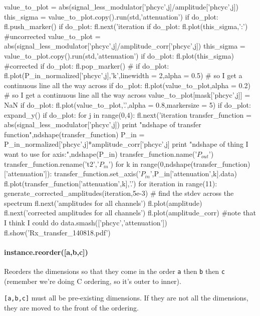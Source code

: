 \begin{python}
{{{        value_to_plot = abs(signal_less_modulator['phcyc',j]/amplitude['phcyc',j])
        this_sigma = value_to_plot.copy().run(std,'attenuation')
        if do_plot: fl.push_marker()
        if do_plot: fl.next('iteration %
        if do_plot: fl.plot(this_sigma,':') #uncorrected
        value_to_plot = abs(signal_less_modulator['phcyc',j]/amplitude_corr['phcyc',j])
        this_sigma = value_to_plot.copy().run(std,'attenuation')
        if do_plot: fl.plot(this_sigma) #corrected
        if do_plot: fl.pop_marker()
        #}}}
        if do_plot: fl.plot(P_in_normalized['phcyc',j],'k',linewidth = 2,alpha = 0.5) # so I get a continuous line all the way across
        if do_plot: fl.plot(value_to_plot,alpha = 0.2) # so I get a continuous line all the way across
        value_to_plot[mask['phcyc',j]] = NaN
        if do_plot: fl.plot(value_to_plot,'.',alpha = 0.8,markersize = 5)
        if do_plot: expand_y()
    if do_plot:
        for j in range(0,4):
            fl.next('iteration %
            transfer_function = abs(signal_less_modulator['phcyc',j])
            print "ndshape of transfer function",ndshape(transfer_function)
            P_in = P_in_normalized['phcyc',j]*amplitude_corr['phcyc',j]
            print "ndshape of thing I want to use for axis:",ndshape(P_in)
            transfer_function.name('$P_{out}$')
            transfer_function.rename('t2','$P_{in}$')
            for k in range(0,ndshape(transfer_function)['attenuation']):
                transfer_function.set_axis('$P_{in}$',P_in['attenuation',k].data)
                fl.plot(transfer_function['attenuation',k],'.')
for iteration in range(11):
    generate_corrected_amplitudes(iteration,5e-3)
# find the stdev across the spectrum
fl.next('amplitudes for all channels')
fl.plot(amplitude)
fl.next('corrected amplitudes for all channels')
fl.plot(amplitude_corr)
#note that I think I could do data.smash(['phcyc','attenuation'])
fl.show('Rx_transfer_140818.pdf')
\end{python}
\paragraph{instance.reorder([a,b,c])}
Reorders the dimensions so that they come in the order \texttt{a} then \texttt{b} then \texttt{c} 
(remember we're doing C ordering, so it's outer to inner).

\texttt{[a,b,c]} must all be pre-existing dimensions.
If they are not all the dimensions, they are moved to the front of the ordering.
